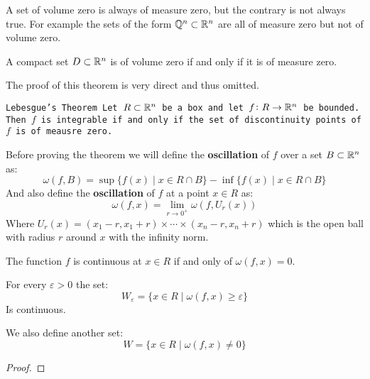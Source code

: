 \documentclass[11pt,a4paper]{article}
\begin{document}
\begin{remark}
  A set of volume zero is always of measure zero, but the
  contrary is not always true. For example the sets of the
  form $\mathbb{Q}^n \subset \mathbb{R}^n$ are all of measure zero but not
  of volume zero.
\end{remark}
\begin{theorem}
  A compact set $D \subset \mathbb{R}^n$ is of volume zero if and only
  if it is of measure zero.
\end{theorem}
The proof of this theorem is very direct and thus omitted.
\begin{theorem}
  \tt{Lebesgue's Theorem} Let $R \subset \mathbb{R}^n$ be 
  a box and let $f \colon R \to \mathbb{R}^n$ be bounded. Then $f$ is integrable
  if and only if the set of discontinuity points of $f$ is of 
  meausre zero.
\end{theorem}
\noindent
Before proving the theorem we will define the \textbf{oscillation}
of $f$ over a set $B \subset \mathbb{R}^n$ as:
\[
  \omega(f,B) = 
  \sup\{f(x) \mid x \in R \cap B\} -
  \inf\{f(x) \mid x \in R \cap B\}
\]
And also define the \textbf{oscillation} of $f$ at a point 
$x \in R$ as:
\[
  \omega(f,x) = \lim_{r \to 0^+}{\omega(f,U_r(x))}
\]
Where $U_r(x) = (x_1-r,x_1+r) \times \cdots \times (x_n-r,x_n+r)$
which is the open ball with radius $r$ around $x$ with the
infinity norm.
\begin{lemma}
  The function $f$ is continuous at $x \in R$ if and only of
  $\omega(f,x) = 0$.
\end{lemma}
\begin{lemma}
  For every $\varepsilon > 0$ the set:
  \[
    W_\varepsilon = 
    \{x \in R \mid \omega(f,x) \geq \varepsilon\}
  \]
  Is continuous.
\end{lemma}
We also define another set:
\[
  W = \{x \in R \mid \omega(f,x) \neq 0\}		
\]
\begin{proof}
\end{proof}
\end{document}
